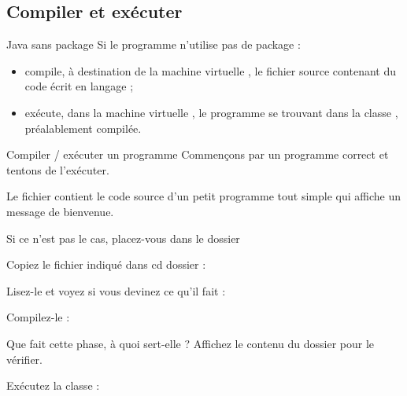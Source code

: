 \documentclass[a4paper,11pt]{style-esi/td}
\begin{document}
	\subsection{Compiler et exécuter}

		\begin{theorie}{Java sans package}
			Si le programme  n'utilise pas de package :
			\begin{itemize}
				\item {} compile, à destination
				      de la machine virtuelle , le fichier source 
				       contenant du code écrit en langage
				       ;
				\item {} exécute, dans la machine virtuelle 
				      , le programme se trouvant dans la classe 
				      , préalablement compilée.
			\end{itemize}
		\end{theorie}

		\begin{Tutoriel}{Compiler / exécuter un programme} 
			Commençons par un programme correct et tentons de l'exécuter.  
		
			Le fichier  
			contient le code source d'un petit programme  tout simple 
			qui affiche un message de bienvenue. 
			
			\begin{steps}	
			\item 
				Si ce n'est pas le cas, placez-vous dans le dossier 
			\item 
				Copiez le fichier indiqué dans cd dossier :
			\item 
				Lisez-le et voyez si vous devinez ce qu'il fait : 
			\item 
				Compilez-le : 
			\item 
				Que fait cette phase, à quoi sert-elle ?
				Affichez le contenu du dossier pour le vérifier.
			\item Exécutez la classe : 
			\end{steps}			
		\end{Tutoriel}

\end{document}
